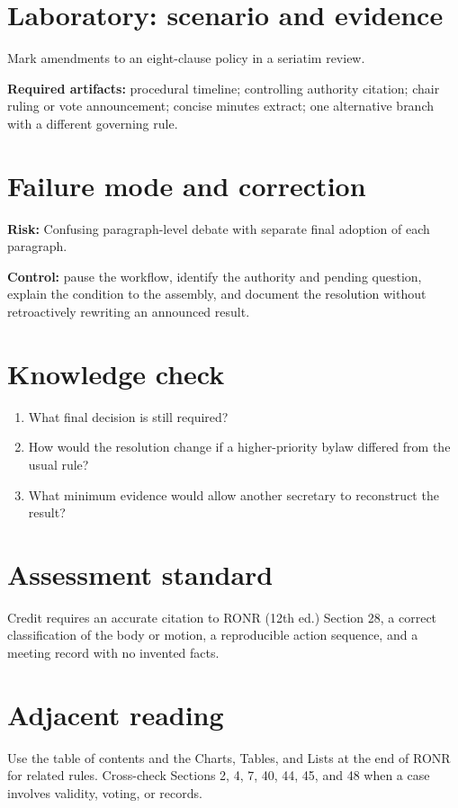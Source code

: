 \documentclass[11pt]{article}
\begin{document}
\section{Laboratory: scenario and evidence}
Mark amendments to an eight-clause policy in a seriatim review.

\textbf{Required artifacts:} procedural timeline; controlling authority citation; chair ruling or vote announcement; concise minutes extract; one alternative branch with a different governing rule.

\section{Failure mode and correction}
\textbf{Risk:} Confusing paragraph-level debate with separate final adoption of each paragraph.

\textbf{Control:} pause the workflow, identify the authority and pending question, explain the condition to the assembly, and document the resolution without retroactively rewriting an announced result.

\section{Knowledge check}
\begin{enumerate}[leftmargin=*,itemsep=4pt]
\item What final decision is still required?
\item How would the resolution change if a higher-priority bylaw differed from the usual rule?
\item What minimum evidence would allow another secretary to reconstruct the result?
\end{enumerate}

\section{Assessment standard}
Credit requires an accurate citation to RONR (12th ed.) Section 28, a correct classification of the body or motion, a reproducible action sequence, and a meeting record with no invented facts.

\section{Adjacent reading}
Use the table of contents and the Charts, Tables, and Lists at the end of RONR for related rules. Cross-check Sections 2, 4, 7, 40, 44, 45, and 48 when a case involves validity, voting, or records.
\end{document}

